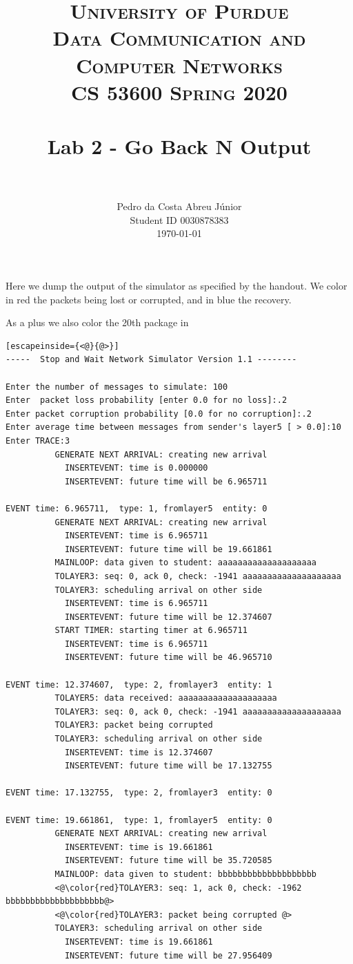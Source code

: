 \documentclass[paper=a4, fontsize=11pt]{scrartcl}
\title{
		\usefont{OT1}{bch}{b}{n}
		\normalfont \normalsize \textsc{University of Purdue\\
      Data Communication and Computer Networks\\
      CS 53600 Spring 2020} \\ [25pt]
		\horrule{0.5pt} \\[0.4cm]
		\huge Lab 2 - Go Back N Output\\
		\horrule{2pt} \\[0.5cm]
}
\author{
		\normalfont\normalsize Pedro da Costa Abreu Júnior\\ [-5pt]
    \normalsize Student ID 0030878383\\[-5pt]
    \normalsize \today
}
\date{}
\numberwithin{equation}{section}		%
\numberwithin{figure}{section}			%
\numberwithin{table}{section}				%
\begin{document}
\maketitle

Here we dump the output of the simulator as specified by the handout. We color in {\color{red}red} the packets being lost or corrupted, and in {\color{blue}blue} the recovery.

As a plus we also color the 20th package in {\color{green}{green}}


\begin{lstlisting}[escapeinside={<@}{@>}]
-----  Stop and Wait Network Simulator Version 1.1 --------

Enter the number of messages to simulate: 100
Enter  packet loss probability [enter 0.0 for no loss]:.2
Enter packet corruption probability [0.0 for no corruption]:.2
Enter average time between messages from sender's layer5 [ > 0.0]:10
Enter TRACE:3
          GENERATE NEXT ARRIVAL: creating new arrival
            INSERTEVENT: time is 0.000000
            INSERTEVENT: future time will be 6.965711

EVENT time: 6.965711,  type: 1, fromlayer5  entity: 0
          GENERATE NEXT ARRIVAL: creating new arrival
            INSERTEVENT: time is 6.965711
            INSERTEVENT: future time will be 19.661861
          MAINLOOP: data given to student: aaaaaaaaaaaaaaaaaaaa
          TOLAYER3: seq: 0, ack 0, check: -1941 aaaaaaaaaaaaaaaaaaaa
          TOLAYER3: scheduling arrival on other side
            INSERTEVENT: time is 6.965711
            INSERTEVENT: future time will be 12.374607
          START TIMER: starting timer at 6.965711
            INSERTEVENT: time is 6.965711
            INSERTEVENT: future time will be 46.965710

EVENT time: 12.374607,  type: 2, fromlayer3  entity: 1
          TOLAYER5: data received: aaaaaaaaaaaaaaaaaaaa
          TOLAYER3: seq: 0, ack 0, check: -1941 aaaaaaaaaaaaaaaaaaaa
          TOLAYER3: packet being corrupted
          TOLAYER3: scheduling arrival on other side
            INSERTEVENT: time is 12.374607
            INSERTEVENT: future time will be 17.132755

EVENT time: 17.132755,  type: 2, fromlayer3  entity: 0

EVENT time: 19.661861,  type: 1, fromlayer5  entity: 0
          GENERATE NEXT ARRIVAL: creating new arrival
            INSERTEVENT: time is 19.661861
            INSERTEVENT: future time will be 35.720585
          MAINLOOP: data given to student: bbbbbbbbbbbbbbbbbbbb
          <@\color{red}TOLAYER3: seq: 1, ack 0, check: -1962 bbbbbbbbbbbbbbbbbbbb@>
          <@\color{red}TOLAYER3: packet being corrupted @>
          TOLAYER3: scheduling arrival on other side
            INSERTEVENT: time is 19.661861
            INSERTEVENT: future time will be 27.956409


\end{lstlisting}
\end{document}
